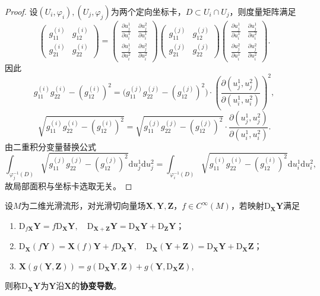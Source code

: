 \documentclass[../../main.tex]{subfiles}%
\begin{document}
\begin{proof}

设$(U_i,\varphi_i),(U_j,\varphi_j)$为两个定向坐标卡，$D\subset U_i\cap U_j$，则度量矩阵满足
\[
\begin{pmatrix}g_{11}^{(i)}&g_{12}^{(i)}\\g_{21}^{(i)}&g_{22}^{(i)}\end{pmatrix}
=\begin{pmatrix}\frac{\partial u_j^1}{\partial u_i^1}&\frac{\partial u_j^2}{\partial u_i^1}\\\frac{\partial u_j^1}{\partial u_i^2}&\frac{\partial u_j^2}{\partial u_i^2}\end{pmatrix}
\begin{pmatrix}g_{11}^{(j)}&g_{12}^{(j)}\\g_{21}^{(j)}&g_{22}^{(j)}\end{pmatrix}
\begin{pmatrix}\frac{\partial u_j^1}{\partial u_i^1}&\frac{\partial u_j^1}{\partial u_i^2}\\\frac{\partial u_j^2}{\partial u_i^1}&\frac{\partial u_j^2}{\partial u_i^2}\end{pmatrix}.
\]
因此
\[
g_{11}^{(i)}g_{22}^{(i)}-(g_{12}^{(i)})^2=\big(g_{11}^{(j)}g_{22}^{(j)}-(g_{12}^{(j)})^2\big)\cdot\left(\frac{\partial(u_j^1,u_j^2)}{\partial(u_i^1,u_i^2)}\right)^2,
\]
\[
\sqrt{g_{11}^{(i)}g_{22}^{(i)}-(g_{12}^{(i)})^2}=\sqrt{g_{11}^{(j)}g_{22}^{(j)}-(g_{12}^{(j)})^2}\cdot\frac{\partial(u_j^1,u_j^2)}{\partial(u_i^1,u_i^2)}.
\]
由二重积分变量替换公式
\[
\int_{\varphi_j^{-1}(D)}\sqrt{g_{11}^{(j)}g_{22}^{(j)}-(g_{12}^{(j)})^2}\mathrm{d}u_j^1\mathrm{d}u_j^2
=\int_{\varphi_i^{-1}(D)}\sqrt{g_{11}^{(i)}g_{22}^{(i)}-(g_{12}^{(i)})^2}\mathrm{d}u_i^1\mathrm{d}u_i^2,
\]
故局部面积与坐标卡选取无关。

\end{proof}

\begin{definition}
设$M$为二维光滑流形，对光滑切向量场$\boldsymbol{X},\boldsymbol{Y},\boldsymbol{Z}$，$f\in C^\infty(M)$，若映射$\mathrm{D}_{\boldsymbol{X}}\boldsymbol{Y}$满足
\begin{enumerate}[(1)]
\item $\mathrm{D}_{f\boldsymbol{X}}\boldsymbol{Y}=f\mathrm{D}_{\boldsymbol{X}}\boldsymbol{Y},\quad \mathrm{D}_{\boldsymbol{X}+\boldsymbol{Z}}\boldsymbol{Y}=\mathrm{D}_{\boldsymbol{X}}\boldsymbol{Y}+\mathrm{D}_{\boldsymbol{Z}}\boldsymbol{Y}$；
\item $\mathrm{D}_{\boldsymbol{X}}(f\boldsymbol{Y})=\boldsymbol{X}(f)\boldsymbol{Y}+f\mathrm{D}_{\boldsymbol{X}}\boldsymbol{Y},\quad \mathrm{D}_{\boldsymbol{X}}(\boldsymbol{Y}+\boldsymbol{Z})=\mathrm{D}_{\boldsymbol{X}}\boldsymbol{Y}+\mathrm{D}_{\boldsymbol{X}}\boldsymbol{Z}$；
\item $\boldsymbol{X}(g(\boldsymbol{Y},\boldsymbol{Z}))=g(\mathrm{D}_{\boldsymbol{X}}\boldsymbol{Y},\boldsymbol{Z})+g(\boldsymbol{Y},\mathrm{D}_{\boldsymbol{X}}\boldsymbol{Z})$,
\end{enumerate}
则称$\mathrm{D}_{\boldsymbol{X}}\boldsymbol{Y}$为$\boldsymbol{Y}$沿$\boldsymbol{X}$的\textbf{协变导数}。
\end{definition}
\end{document}
